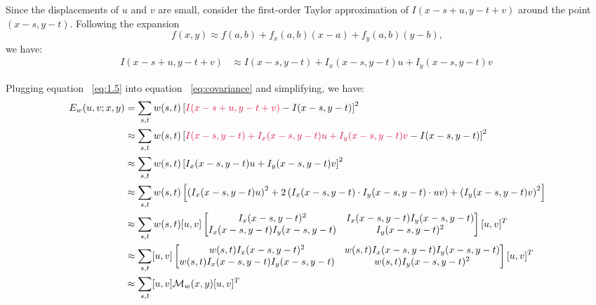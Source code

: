 \newpage
\begin{Answer}
  Since the displacements of $u$ and $v$ are small,
  consider the first-order Taylor approximation of $I(x-s+u,y-t+v)$ around the point $(x-s, y-t)$.
  Following the expansion
  \[ f(x,y) \approx f(a,b) + f_x(a,b)(x-a) + f_y(a,b)(y-b), \]
  we have:
  \begin{align}
    I(x-s+u,y-t+v) &\approx I(x-s,y-t) + I_x(x-s,y-t)u + I_y(x-s,y-t)v ~\label{eq:1.5}
  \end{align}

  \step
  Plugging equation ~\eqref{eq:1.5} into equation ~\eqref{eq:covariance} and simplifying,
  we have:
  \begin{align}
    E_w(u,v;x,y) &= \sum_{s,t} w(s,t) \left[\crim{I(x-s+u,y-t+v)} - I(x-s,y-t)\right]^2 \nonumber \\
    &\approx \sum_{s,t} w(s,t) \left[\crim{I(x-s,y-t) + I_x(x-s,y-t)u + I_y(x-s,y-t)v} - I(x-s,y-t)\right]^2 \nonumber \\
    &\approx \sum_{s,t} w(s,t) \left[I_x(x-s,y-t)u + I_y(x-s,y-t)v\right]^2 \nonumber \\
    &\approx \sum_{s,t} w(s,t) \left[\left(I_x(x-s,y-t)u\right)^2 + 2\left(I_x(x-s,y-t) \cdot I_y(x-s,y-t) \cdot uv\right) + \left(I_y(x-s,y-t)v\right)^2\right] \nonumber \\
    &\approx \sum_{s,t} w(s,t) [u, v]
      \begin{bmatrix}
        I_x(x-s,y-t)^2 & I_x(x-s,y-t)I_y(x-s,y-t) \\
        I_x(x-s,y-t)I_y(x-s,y-t) & I_y(x-s,y-t)^2
      \end{bmatrix}
    [u, v]^T\nonumber \\
    &\approx \sum_{s,t} [u, v]
    \begin{bmatrix}
      w(s,t) I_x(x-s,y-t)^2 &  w(s,t) I_x(x-s,y-t)I_y(x-s,y-t) \\
      w(s,t) I_x(x-s,y-t)I_y(x-s,y-t) &  w(s,t) I_y(x-s,y-t)^2
    \end{bmatrix}
  [u, v]^T \nonumber \\
  &\approx  \sum_{s,t} [u, v] {\calM}_w(x,y) [u, v]^T~\label{eq:estimation-derived}
  \end{align}
\end{Answer}
